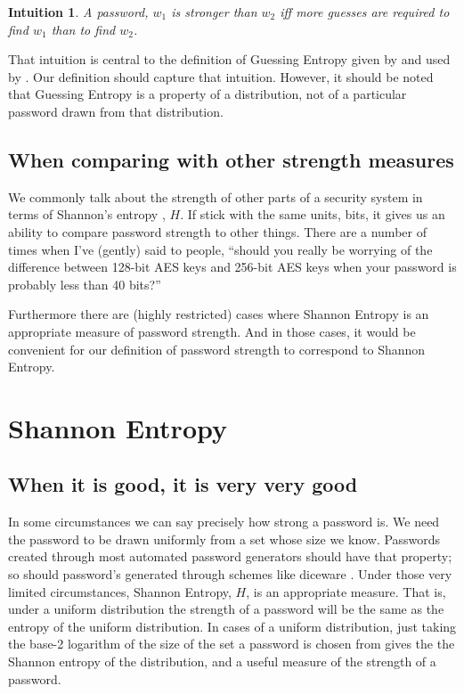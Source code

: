 \documentclass[12pt]{article}
\newtheorem{intuition}{Intuition}
\begin{document}
\begin{intuition}
A password, $w_{1}$ is stronger than $w_{2}$ iff more guesses are required to find $w_{1}$ than to find $w_{2}$.
\end{intuition}
That intuition is central to the definition of Guessing Entropy given by \textcite{Massey94:ISMT} and used by \textcite{WeirETAL2010:CCS}. Our definition should capture that intuition. However, it should be noted that Guessing Entropy is a property of a distribution, not of a particular password drawn from that distribution.

\subsection{When comparing with other strength measures}

We commonly talk about the strength of other parts of a security system in terms of Shannon’s entropy \parencite{Shannon:48}, $H$. If stick with the same units, bits, it gives us an ability to compare password strength to other things. There are a number of times when I’ve (gently) said to people, “should you really be worrying of the difference between 128-bit AES keys and 256-bit AES keys when your password is probably less than 40 bits?”

Furthermore there are (highly restricted) cases where Shannon Entropy is an appropriate measure of password strength. And in those cases, it would be convenient for our definition of password strength to correspond to Shannon Entropy.

\section{Shannon Entropy}

\subsection{When it is good, it is very very good}\label{sec:bits}

In some circumstances we can say precisely how strong a password is. We need the password to be drawn uniformly from a set whose size we know.  Passwords created through most automated password generators should have that property; so should password’s generated through schemes like diceware \parencite{Reinhold:diceware}. Under those very limited circumstances, Shannon Entropy, $H$, is an appropriate measure. That is, under a uniform distribution the strength of a password will be the same as the entropy of the uniform distribution. In cases of a uniform distribution, just taking the base-2 logarithm of the size of the set a password is chosen from gives the the Shannon entropy of the distribution, and a useful measure of the strength of a password.
\end{document}
